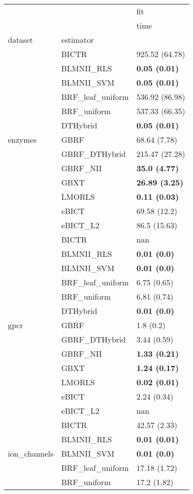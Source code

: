 \begin{tabular}{lll}
\toprule
 &  & fit \\
 &  & time \\
dataset & estimator &  \\
\midrule
\multirow[c]{13}{*}{enzymes} & BICTR & 925.52 (64.78) \\
 & BLMNII\_RLS & \textbf{0.05 (0.01)} \\
 & BLMNII\_SVM & \textbf{0.05 (0.01)} \\
 & BRF\_leaf\_uniform & 536.92 (86.98) \\
 & BRF\_uniform & 537.33 (66.35) \\
 & DTHybrid & \textbf{0.05 (0.01)} \\
 & GBRF & 68.64 (7.78) \\
 & GBRF\_DTHybrid & 215.47 (27.28) \\
 & GBRF\_NII & \textbf{35.0 (4.77)} \\
 & GBXT & \textbf{26.89 (3.25)} \\
 & LMORLS & \textbf{0.11 (0.03)} \\
 & eBICT & 69.58 (12.2) \\
 & eBICT\_L2 & 86.5 (15.63) \\
\cline{1-2}
\multirow[c]{13}{*}{gpcr} & BICTR & nan \\
 & BLMNII\_RLS & \textbf{0.01 (0.0)} \\
 & BLMNII\_SVM & \textbf{0.01 (0.0)} \\
 & BRF\_leaf\_uniform & 6.75 (0.65) \\
 & BRF\_uniform & 6.81 (0.74) \\
 & DTHybrid & \textbf{0.01 (0.0)} \\
 & GBRF & 1.8 (0.2) \\
 & GBRF\_DTHybrid & 3.44 (0.59) \\
 & GBRF\_NII & \textbf{1.33 (0.21)} \\
 & GBXT & \textbf{1.24 (0.17)} \\
 & LMORLS & \textbf{0.02 (0.01)} \\
 & eBICT & 2.24 (0.34) \\
 & eBICT\_L2 & nan \\
\cline{1-2}
\multirow[c]{13}{*}{ion\_channels} & BICTR & 42.57 (2.33) \\
 & BLMNII\_RLS & \textbf{0.01 (0.01)} \\
 & BLMNII\_SVM & \textbf{0.01 (0.0)} \\
 & BRF\_leaf\_uniform & 17.18 (1.72) \\
 & BRF\_uniform & 17.2 (1.82) \\

\end{tabular}
